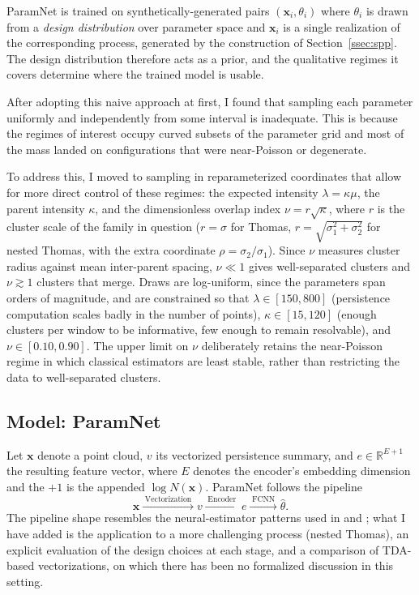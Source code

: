 \documentclass[11pt,a4paper]{article}
\newcommand{\R}{\mathbb{R}}
\newcommand{\pc}{\mathbf{x}}
\begin{document}
ParamNet is trained on synthetically-generated pairs $(\pc_i, \theta_i)$
where $\theta_i$ is drawn from a \emph{design distribution} over parameter space
and $\pc_i$ is a single realization of the corresponding process, generated by
the construction of Section~\ref{ssec:spp}. The design distribution therefore
acts as a prior, and the qualitative regimes it covers determine where the
trained model is usable.

After adopting this naive approach at first, I found that sampling each parameter uniformly and independently from some interval is inadequate. This is because the regimes of interest occupy curved subsets of the parameter grid and most of the mass landed on configurations that were near-Poisson or degenerate. 

To address this, I moved to sampling in reparameterized coordinates that allow for more direct control of these regimes: the expected intensity
$\lambda = \kappa\mu$, the parent intensity $\kappa$, and the dimensionless
overlap index $\nu = r\sqrt{\kappa}$, where $r$ is the cluster scale of the
family in question ($r=\sigma$ for Thomas, $r=\sqrt{\sigma_1^2+\sigma_2^2}$ for nested Thomas, with the extra coordinate $\rho = \sigma_2/\sigma_1$). Since $\nu$ measures cluster radius against mean inter-parent spacing, $\nu \ll 1$ gives well-separated clusters and $\nu \gtrsim 1$ clusters that merge. Draws are log-uniform, since the parameters span orders of magnitude, and are constrained so that $\lambda \in [150,800]$ (persistence computation scales badly in the number of points), $\kappa \in [15,120]$ (enough clusters per window to be informative, few enough to remain resolvable), and $\nu \in [0.10,0.90]$. The upper limit on $\nu$ deliberately retains the near-Poisson regime in which classical estimators are least stable, rather than restricting the data to well-separated clusters.

\subsection{Model: ParamNet}
\label{ssec:method}

Let $\pc$ denote a point cloud, $v$ its vectorized persistence summary, and
$e \in \R^{E + 1}$ the resulting feature vector, where $E$ denotes the encoder's
embedding dimension and the $+1$ is the appended $\log N(\pc)$. ParamNet
follows the pipeline
    \begin{equation}
    \label{eq:pipeline}
    \pc \xrightarrow{\;\text{Vectorization}\;} v
    \xrightarrow{\;\text{Encoder}\;} e
    \xrightarrow{\;\text{FCNN}\;} \hat\theta.
    \end{equation}
The pipeline shape resembles the neural-estimator patterns used in
\citet{vihrs2022neural} and \citet{yip2025learning}; what I have added is the
application to a more challenging process (nested Thomas), an explicit
evaluation of the design choices at each stage, and a comparison of TDA-based
vectorizations, on which there has been no formalized discussion in this
setting.
\end{document}
